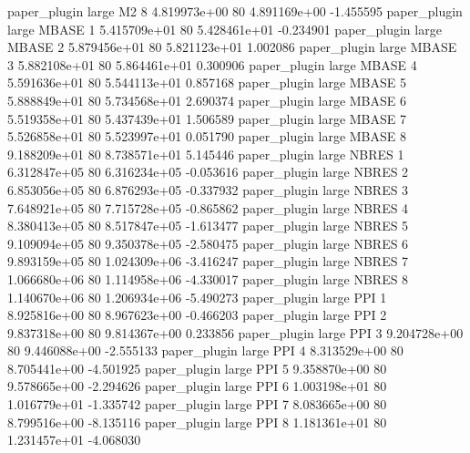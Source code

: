        paper_plugin      large       M2                 8 4.819973e+00 80   4.891169e+00          -1.455595
       paper_plugin      large    MBASE                 1 5.415709e+01 80   5.428461e+01          -0.234901
       paper_plugin      large    MBASE                 2 5.879456e+01 80   5.821123e+01           1.002086
       paper_plugin      large    MBASE                 3 5.882108e+01 80   5.864461e+01           0.300906
       paper_plugin      large    MBASE                 4 5.591636e+01 80   5.544113e+01           0.857168
       paper_plugin      large    MBASE                 5 5.888849e+01 80   5.734568e+01           2.690374
       paper_plugin      large    MBASE                 6 5.519358e+01 80   5.437439e+01           1.506589
       paper_plugin      large    MBASE                 7 5.526858e+01 80   5.523997e+01           0.051790
       paper_plugin      large    MBASE                 8 9.188209e+01 80   8.738571e+01           5.145446
       paper_plugin      large    NBRES                 1 6.312847e+05 80   6.316234e+05          -0.053616
       paper_plugin      large    NBRES                 2 6.853056e+05 80   6.876293e+05          -0.337932
       paper_plugin      large    NBRES                 3 7.648921e+05 80   7.715728e+05          -0.865862
       paper_plugin      large    NBRES                 4 8.380413e+05 80   8.517847e+05          -1.613477
       paper_plugin      large    NBRES                 5 9.109094e+05 80   9.350378e+05          -2.580475
       paper_plugin      large    NBRES                 6 9.893159e+05 80   1.024309e+06          -3.416247
       paper_plugin      large    NBRES                 7 1.066680e+06 80   1.114958e+06          -4.330017
       paper_plugin      large    NBRES                 8 1.140670e+06 80   1.206934e+06          -5.490273
       paper_plugin      large      PPI                 1 8.925816e+00 80   8.967623e+00          -0.466203
       paper_plugin      large      PPI                 2 9.837318e+00 80   9.814367e+00           0.233856
       paper_plugin      large      PPI                 3 9.204728e+00 80   9.446088e+00          -2.555133
       paper_plugin      large      PPI                 4 8.313529e+00 80   8.705441e+00          -4.501925
       paper_plugin      large      PPI                 5 9.358870e+00 80   9.578665e+00          -2.294626
       paper_plugin      large      PPI                 6 1.003198e+01 80   1.016779e+01          -1.335742
       paper_plugin      large      PPI                 7 8.083665e+00 80   8.799516e+00          -8.135116
       paper_plugin      large      PPI                 8 1.181361e+01 80   1.231457e+01          -4.068030
